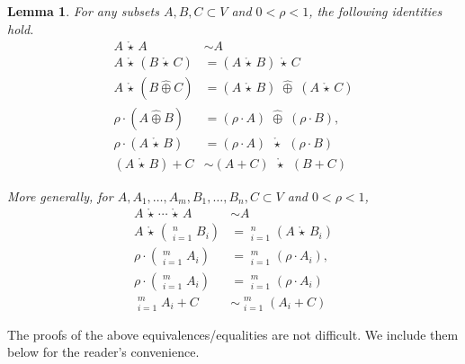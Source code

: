 \documentclass[10pt]{amsart}
\theoremstyle{plain}
\newtheorem{lemma}{Lemma}[section]
\theoremstyle{definition}
\providecommand{\cplus}[0]{\ensuremath{\hat{\oplus}}\xspace}
\providecommand{\Cplus}[0]{\ensuremath{\mathop{\widehat{\bigoplus}}}\xspace}
\providecommand{\cmult}[0]{\ensuremath{{\,\mathring{\star}\,}}\xspace}
\providecommand{\Cmult}[0]{\ensuremath{\mathop{\mathring{\bigstar}}}\xspace}
\begin{document}
\begin{lemma}
\label{lem:prop-set-ops}
    For any subsets $A,B,C\subset V$ and $0<\rho<1$, the following identities hold. 
    \begin{align}
        A \cmult A &\sim A \label{eqn:idempotent-cmult}\\
        A\cmult(B\cmult C) &= (A\cmult B)\cmult C \label{eqn:associative-cmult}\\
        A\cmult(B\cplus C) &= (A\cmult B) \;\cplus\; (A\cmult C) \label{eqn:dist-cmult-cplus}\\
        \rho\cdot (A \cplus B) &= (\rho\cdot A) \;\cplus\; (\rho\cdot B) \label{eqn:dist-scal-cplus},\\
        \rho\cdot (A\cmult B) &= (\rho\cdot A) \;\cmult\; (\rho\cdot B) \label{eqn:dist-scal-cmult}\\
        (A\cmult B) + C &\sim (A+C)\;\cmult\;(B+C) \label{eqn:dist-minkowski-cmult}
    \end{align}

More generally, for $A,A_1,\ldots,A_m, B_1,\ldots,B_n, C\subset V$ and $0 < \rho < 1$,
\begin{align}
       A \cmult \cdots \cmult A  &\sim A \label{eqn:idempotent-cmult-general}\\
        A\cmult\left(\Cplus_{i=1}^n B_i\right) &= \Cplus_{i=1}^n\left(A\cmult B_i\right) \label{eqn:dist-cmult-cplus-general}\\
        \rho\cdot \left(\Cplus_{i=1}^m A_i\right) &= \Cplus_{i=1}^m \left(\rho\cdot A_i\right) \label{eqn:dist-scal-cplus-general},\\
        \rho\cdot \left(\Cmult_{i=1}^m A_i\right) &= \Cmult_{i=1}^m \left(\rho\cdot A_i\right) \label{eqn:dist-scal-cmult-general}\\
        \Cmult_{i=1}^m A_i + C &\sim  \Cmult_{i=1}^m \left(A_i+C\right) \label{eqn:dist-minkowski-cmult-general}
    \end{align}
\end{lemma}
The proofs of the above equivalences/equalities are not difficult. We 
include them below for the reader's convenience. 
\end{document}
